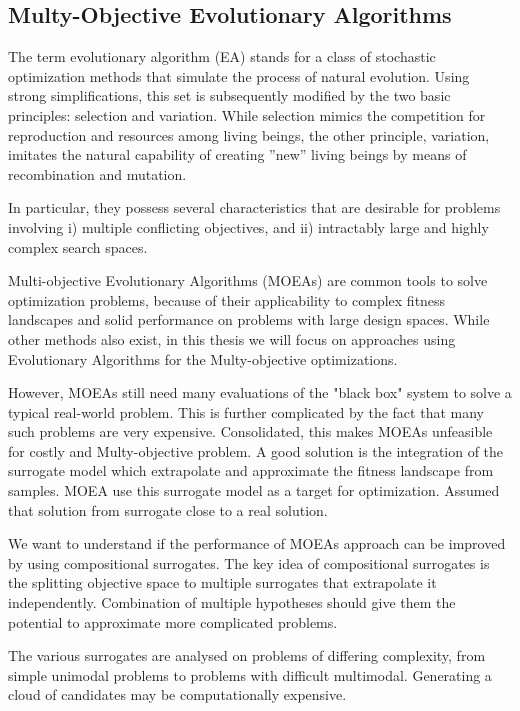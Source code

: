         \subsection{Multy-Objective Evolutionary Algorithms}
            The term evolutionary algorithm (EA) stands for a class of stochastic optimization methods that simulate the process of natural evolution.
            Using strong simplifications, this set is subsequently modified by the two basic principles: selection and variation.
            While selection mimics the competition for reproduction and resources among living beings, the other principle, variation, imitates the natural capability of creating ”new” living beings by means of recombination and mutation. 

            In particular, they possess several characteristics that are desirable for problems involving i) multiple conflicting objectives, and ii) intractably large and highly complex
            search spaces.
            

            Multi-objective Evolutionary Algorithms (MOEAs) are common tools to solve optimization problems, 
            because of their applicability to complex fitness landscapes and solid performance on problems with large design spaces. 
            While other methods also exist, in this thesis we will focus on approaches using Evolutionary Algorithms for the Multy-objective optimizations.

            However, MOEAs still need many evaluations of the "black box" system to solve a typical real-world problem. 
            This is further complicated by the fact that many such problems are very expensive. Consolidated, this makes MOEAs unfeasible for costly and Multy-objective problem.
            A good solution is the integration of the surrogate model which extrapolate and approximate the fitness landscape from samples. MOEA use this surrogate model 
            as a target for optimization. Assumed that solution from surrogate close to a real solution.
            
            We want to understand if the performance of MOEAs approach can be improved by using compositional surrogates. 
            The key idea of compositional surrogates is the splitting objective space to multiple surrogates that extrapolate it independently. 
            Combination of multiple hypotheses should give them the potential to approximate more complicated problems. 

            The various surrogates are analysed on problems of differing complexity, from simple unimodal problems to problems with difficult multimodal. 
            Generating a cloud of candidates may be computationally expensive.

